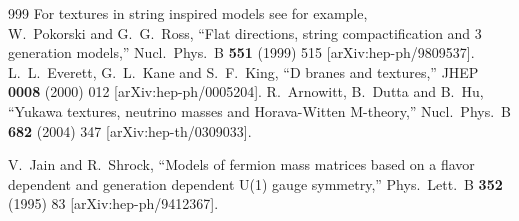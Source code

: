\begin{thebibliography}{999}
For textures in string inspired models see for example, \\
  W.~Pokorski and G.~G.~Ross,
  ``Flat directions, string compactification and 3 generation models,''
  Nucl.\ Phys.\ B {\bf 551} (1999) 515
  [arXiv:hep-ph/9809537].
  L.~L.~Everett, G.~L.~Kane and S.~F.~King,
  ``D branes and textures,''
  JHEP {\bf 0008} (2000) 012
  [arXiv:hep-ph/0005204].
 R.~Arnowitt, B.~Dutta and B.~Hu,
  ``Yukawa textures, neutrino masses and Horava-Witten M-theory,''
  Nucl.\ Phys.\ B {\bf 682} (2004) 347
  [arXiv:hep-th/0309033].

  V.~Jain and R.~Shrock,
  ``Models of fermion mass matrices based on a flavor dependent and generation
  dependent U(1) gauge symmetry,''
  Phys.\ Lett.\ B {\bf 352} (1995) 83
  [arXiv:hep-ph/9412367].


\end{thebibliography}
